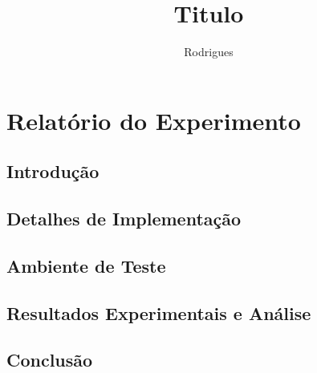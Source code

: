 \documentclass{infufrgs}
\title{Titulo}
\author{Rodrigues}{Juliana}
\begin{document}
\maketitle


\chapter{Relatório do Experimento}
\section{Introdução}


\section{Detalhes de Implementação}

\section{Ambiente de Teste}


\section{Resultados Experimentais e Análise}

\section{Conclusão}
\end{document}
